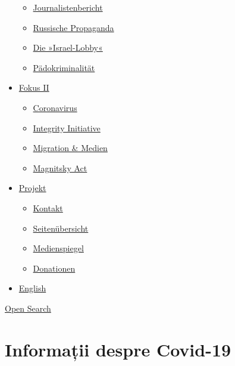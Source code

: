 \begin{itemize}
  \begin{itemize}
  \tightlist
  \item
    \href{https://swprs.org/bericht-eines-journalisten/}{Journalistenbericht}
  \item
    \href{https://swprs.org/russische-propaganda/}{Russische Propaganda}
  \item
    \href{https://swprs.org/die-israel-lobby-fakten-und-mythen/}{Die
    »Israel-Lobby«}
  \item
    \href{https://swprs.org/geopolitik-und-paedokriminalitaet/}{Pädokriminalität}
  \end{itemize}
\item
  \href{https://swprs.org/migration-und-medien/}{Fokus II}

  \begin{itemize}
  \tightlist
  \item
    \href{https://swprs.org/covid-19-hinweis-ii/}{Coronavirus}
  \item
    \href{https://swprs.org/die-integrity-initiative/}{Integrity
    Initiative}
  \item
    \href{https://swprs.org/migration-und-medien/}{Migration \& Medien}
  \item
    \href{https://swprs.org/der-fall-magnitsky/}{Magnitsky Act}
  \end{itemize}
\item
  \href{https://swprs.org/kontakt/}{Projekt}

  \begin{itemize}
  \tightlist
  \item
    \href{https://swprs.org/kontakt/}{Kontakt}
  \item
    \href{https://swprs.org/uebersicht/}{Seitenübersicht}
  \item
    \href{https://swprs.org/medienspiegel/}{Medienspiegel}
  \item
    \href{https://swprs.org/donationen/}{Donationen}
  \end{itemize}
\item
  \href{https://swprs.org/contact/}{English}
\end{itemize}

\protect\hyperlink{}{Open Search}

\hypertarget{informaux21bii-despre-covid-19}{%
\section{Informații despre
Covid-19}\label{informaux21bii-despre-covid-19}}

